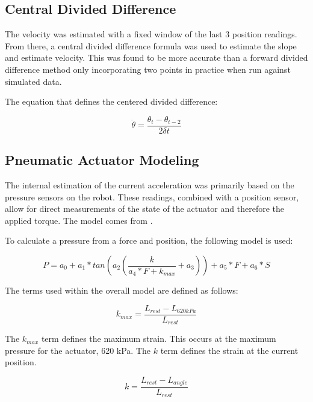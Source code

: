 \subsection{Central Divided Difference}

The velocity was estimated with a fixed window of the last 3 position readings.
From there, a central divided difference formula was used to estimate the
slope and estimate velocity. This was found to be more accurate than a forward
divided difference method only incorporating two points in practice when run
against simulated data.

The equation that defines the centered divided difference:

\begin{equation}
\dot{\theta} = \dfrac{\theta_{t} - \theta_{t - 2}}{2 \delta t}
\end{equation}

\subsection{Pneumatic Actuator Modeling}

The internal estimation of the current acceleration was primarily based on the 
pressure sensors on the robot. These readings, combined with a position sensor, 
allow for direct measurements of the state of the actuator and therefore the
applied torque. The model comes from \cite{HuntPMuscles}.

To calculate a pressure from a force and position, the following model is used:

\begin{equation}
P = a_{0} + a_{1} * tan \left(a_{2} \left(\dfrac{k}{a_{4} * F + k_{max}} + a_{3} \right) \right) + a_{5} * F + a_{6} * S
\end{equation}

The terms used within the overall model are defined as follows:

\begin{equation}
k_{max} = \dfrac{L_{rest} - L_{620 kPa}}{L_{rest}}
\end{equation}

The $k_{max}$ term defines the maximum strain. This occurs at the maximum pressure for the actuator, 620 kPa. The $k$ term defines the strain at the current position.

\begin{equation}
k = \dfrac{L_{rest} - L_{angle}}{L_{rest}}
\end{equation}

